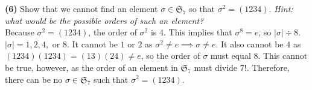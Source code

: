 \documentclass[12pt,letterpaper]{article}
\begin{document}
\textbf{(6)} Show that we cannot find an element \(\sigma \in \mathfrak{S}_{7}\) so that \(\sigma^{2} = (1234).\) \textit{Hint: what would be the possible orders of such an element?}\\

Because \(\sigma^{2} = (1234)\), the order of \(\sigma^{2}\) is 4. This implies that \(\sigma^{8} = e\), so \(|\sigma| \div 8\). \(|\sigma| = 1,2,4,\) or \(8\). It cannot be \(1\) or \(2\) as \(\sigma^{2} \neq e \implies \sigma \neq e\). It also cannot be \(4\) as \((1234)(1234) = (13)(24) \neq e\), so the order of \(\sigma\) must equal 8. This cannot be true, however, as the order of an element in \(\mathfrak{S}_{7}\) must divide \(7!\). Therefore, there can be no \(\sigma \in \mathfrak{S}_{7}\) such that \(\sigma^{2} = (1234)\). 
\end{document}
